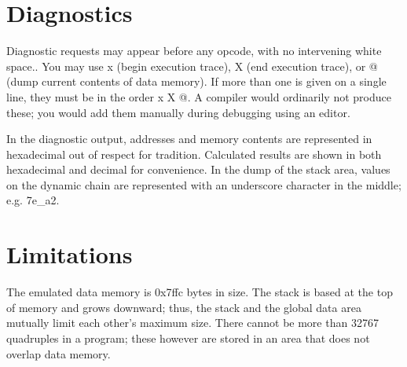 \documentclass[12pt]{article}
\begin{document}
\section*{Diagnostics}
     Diagnostic requests may appear before any opcode, with no intervening white space.. You may
     use x (begin execution trace), X (end execution trace), or @ (dump current contents of data memory).
     If more than one is given on a single line, they must be in the order x X @. A compiler would ordinarily
     not produce these; you would add them manually during debugging using an editor.
     
     In the diagnostic output, addresses and memory contents are represented in hexadecimal out of respect
     for tradition. Calculated results are shown in both hexadecimal and decimal for convenience. In the dump
     of the stack area, values on the dynamic chain are represented with an underscore character in the middle;
     e.g. 7e\_a2.
     
\section*{Limitations}
     The emulated data memory is 0x7ffc bytes in size. The stack is based at the top of memory and grows downward;
     thus, the stack and the global data area mutually limit each other's maximum size. There cannot be more than 32767
     quadruples in a program; these however are stored in an area that does not overlap data memory.
     
\end{document}
